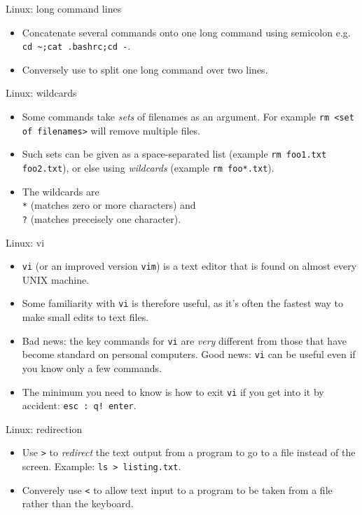 \documentclass{beamer}
\newcommand{\command}[1]{\colorbox{light-gray}{\texttt{#1}}}
\begin{document}
\begin{frame}{Linux: long command lines}
  \begin{itemize}
  \item Concatenate several commands onto one long command using semicolon e.g. \command{cd \textasciitilde;cat .bashrc;cd -}.
  \item Conversely use \command{} to split one long command over two lines.
  \end{itemize}
\end{frame}


\begin{frame}{Linux: wildcards}
  \begin{itemize}
  \item Some commands take \textit{sets} of filenames as an argument. For example \command{rm <set of filenames>} will remove multiple files.
  \item Such sets can be given as a space-separated list (example \command{rm foo1.txt foo2.txt}), or else using \textit{wildcards} (example \command{rm foo*.txt}).
  \item The wildcards are \\ \command{*} (matches zero or more characters) and \\ \command{?} (matches preceisely one character).
  \end{itemize}
\end{frame}


\begin{frame}{Linux: vi}
  \begin{itemize}
  \item \command{vi} (or an improved version \command{vim}) is a text editor that is found on almost every UNIX machine.
  \item Some familiarity with \command{vi} is therefore useful, as it's often the fastest way to make small edits to text files.
  \item Bad news: the key commands for \command{vi} are \textit{very} different from those that have become standard on personal computers. Good news:  \command{vi} can be useful even if you know only a few commands.
  \item The minimum you need to know is how to exit \command{vi} if you get into it by accident: \command{esc : q! enter}.
  \end{itemize}
\end{frame}


\begin{frame}{Linux: redirection}
  \begin{itemize}
  \item Use \command{>} to \textit{redirect} the text output from a program to go to a file instead of the screen. Example: \command{ls >  listing.txt}.
  \item Converely use \command{<} to allow text input to a program to be taken from a file rather than the keyboard.
  \end{itemize}
\end{frame}
\end{document}
